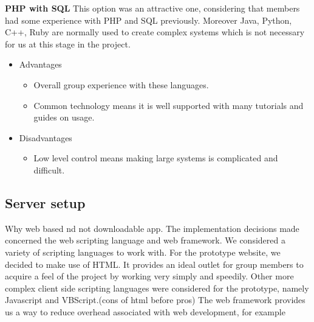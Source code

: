 \newpage
\textbf{PHP with SQL}
\newline
\newline
This option was an attractive one, considering that members had some experience with PHP and SQL previously. Moreover Java, Python, C++, Ruby are normally used to create complex systems which is not necessary for us 
at this stage in the project.
\begin{itemize}
\item Advantages
	\begin{itemize}
	\item Overall group experience with these languages. 
	\item Common technology means it is well supported with many tutorials and guides on usage.
	\end {itemize}
\item Disadvantages
	\begin{itemize}
	\item Low level control means making large systems is complicated and difficult.
	\end {itemize}
\end {itemize}
\subsection{Server setup}

Why web based nd not downloadable app. The implementation decisions made concerned the web scripting language and web framework. 
We considered a variety of scripting languages to work with. For the prototype website, we decided to make use of HTML. It provides an ideal outlet for group members to acquire a feel of the project by working very simply and speedily. Other more complex client side scripting languages were considered for the prototype, namely Javascript and VBScript.(cons of html before pros)
The web framework provides us a way to reduce overhead associated with web development, for example 

